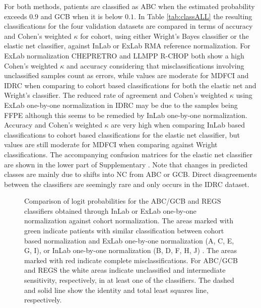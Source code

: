 \documentclass[10pt,letterpaper]{article}
\begin{document}
For both methods, patients are classified as ABC when the estimated probability exceeds $0.9$ and GCB when it is below $0.1$.
In Table \mbox{\ref{tab:classALL}} the resulting classifications for the four validation datasets are compared in terms of accuracy and Cohen's weighted $\kappa$ for cohort, using either Wright's Bayes classifier or the elastic net classifier, against InLab or ExLab RMA reference normalization.
For ExLab normalization CHEPRETRO and LLMPP R-CHOP both show a high Cohen's weighted $\kappa$ and accuracy considering that misclassifications involving unclassified samples count as errors, while values are moderate for MDFCI and IDRC when comparing to cohort based classifications for both the elastic net and Wright's classifier. 
The reduced rate of agreement and Cohen's weighted $\kappa$ using ExLab one-by-one normalization in IDRC may be due to the samples being FFPE although this seems to be remedied by InLab one-by-one normalization. Accuracy and Cohen's weighted $\kappa$ are very high when comparing InLab based classifications to cohort based classifications for the elastic net classifier, but values are still moderate for MDFCI when comparing against Wright classifications.
The accompanying confusion matrices for the elastic net classifier are shown in the lower part of Supplementary .
Note that changes in predicted classes are mainly due to shifts into NC from ABC or GCB.
Direct disagreements between the classifiers are seemingly rare and only occurs in the IDRC dataset.



\begin{figure}
	\begin{center}
	\end{center}
	\caption{
		Comparison of logit probabilities for the ABC/GCB and REGS classifiers obtained through InLab or ExLab one-by-one normalization against cohort normalization.
		The areas marked with green indicate patients with similar classification between cohort based normalization and ExLab one-by-one normalization (A, C, E, G, I), or InLab one-by-one normalization (B, D, F, H, J) .
		The areas marked with red indicate complete misclassifications.
		For ABC/GCB and REGS the white areas indicate unclassified and intermediate sensitivity, respectively, in at least one of the classifiers.
		The dashed and solid line show the identity and total least squares line, respectively.
	}
	\label{fig:ABCGCBDrug}
\end{figure}
\end{document}
